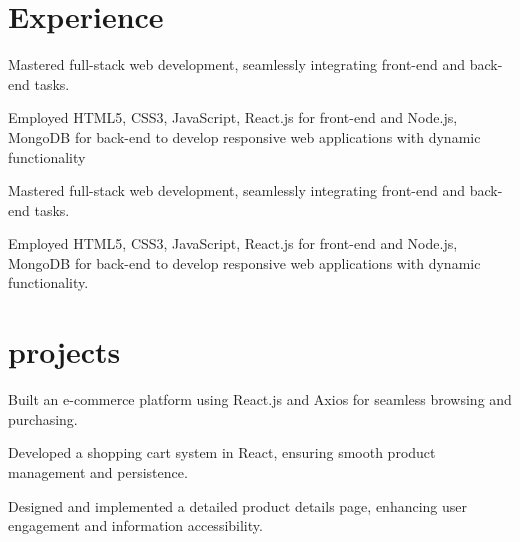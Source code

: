\begin{minipage}[t]{0.66\textwidth} 

\section{Experience}

\begin{tightemize} 
\vspace{\topsep}
\item Mastered full-stack web development, seamlessly integrating front-end and back-end tasks. 
\item Employed HTML5, CSS3, JavaScript, React.js for front-end and Node.js, MongoDB for back-end to develop responsive web applications with dynamic functionality
\end{tightemize}

\vspace{\topsep} 

\begin{tightemize} 

\item Mastered full-stack web development, seamlessly integrating front-end and back-end tasks. 
\item Employed HTML5, CSS3, JavaScript, React.js for front-end and Node.js, MongoDB for back-end to develop responsive web applications with dynamic functionality.

\end{tightemize}
\sectionsep

\section{projects}

\href{https://github.com/iamrudhresh/FakeStore-Project}{\bf {}}
\begin{tightemize}
\item Built an e-commerce platform using React.js and Axios for seamless browsing and purchasing.
\item Developed a shopping cart system in React, ensuring smooth product management and persistence.
\item Designed and implemented a detailed product details page, enhancing user engagement and information accessibility.
\end{tightemize}


\end{minipage}
